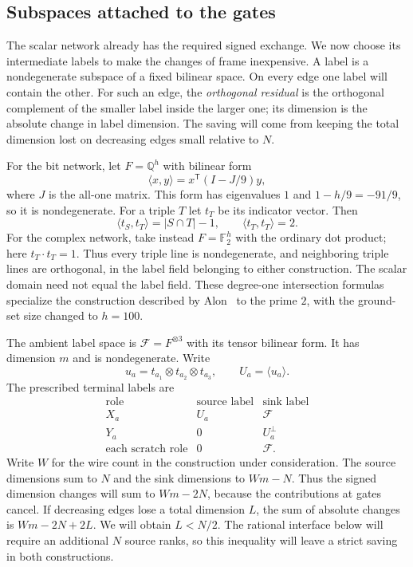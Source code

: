 \documentclass[11pt]{article}
\theoremstyle{definition}
\begin{document}
\subsection{Subspaces attached to the gates}

The scalar network already has the required signed exchange. We now
choose its intermediate labels to make the changes of frame inexpensive.
A label is a nondegenerate subspace of a fixed bilinear space. On every
edge one label will contain the other. For such an edge, the
\emph{orthogonal residual} is the orthogonal complement of the smaller label inside
the larger one; its dimension is the absolute change in label dimension.
The saving will come from keeping the total dimension lost on decreasing
edges small relative to $N$.

For the bit network, let $F=\mathbb Q^h$ with bilinear form
\[
 \langle x,y\rangle=x^{\mathsf T}(I-J/9)y,
\]
where $J$ is the all-one matrix.  This form has eigenvalues $1$ and
$1-h/9=-91/9$, so it is nondegenerate.  For a triple $T$ let $t_T$ be
its indicator vector.  Then
\[
 \langle t_S,t_T\rangle=|S\cap T|-1,
 \qquad \langle t_T,t_T\rangle=2.
\]
For the complex network, take instead $F=\mathbb F_2^h$ with the
ordinary dot product; here $t_T\cdot t_T=1$.
Thus every triple line is nondegenerate, and neighboring triple lines
are orthogonal, in the label field belonging to either construction.
The scalar domain need not equal the label field.
These degree-one intersection formulas specialize the construction
described by Alon~\cite[Section~3, remark after Theorem~1.1]{Alon1998}
to the prime $2$, with the ground-set size changed to $h=100$.

The ambient label space is $\mathcal F=F^{\otimes3}$ with its tensor
bilinear form.  It has dimension $m$ and is nondegenerate.  Write
\[
 u_a=t_{a_1}\otimes t_{a_2}\otimes t_{a_3},\qquad U_a=\langle u_a\rangle.
\]
The prescribed terminal labels are
\[
\begin{array}{c|cc}
\text{role}&\text{source label}&\text{sink label}\\ \hline
X_a&U_a&\mathcal F\\
Y_a&0&U_a^\perp\\
\text{each scratch role}&0&\mathcal F.
\end{array}
\]
Write $W$ for the wire count in the construction under consideration.
The source dimensions sum to $N$ and the sink dimensions to $Wm-N$.
Thus the signed dimension changes will sum to $Wm-2N$, because the
contributions at gates cancel. If decreasing edges lose a total
dimension $L$, the sum of absolute changes is $Wm-2N+2L$.
We will obtain $L<N/2$. The rational interface below will require
an additional $N$ source ranks, so this inequality will leave a strict
saving in both constructions.
\end{document}
